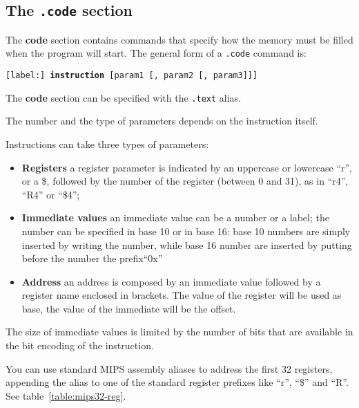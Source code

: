 \documentclass[12pt]{report}
\begin{document}
\subsection{The \texttt{.code} section}
The \textbf{code} section contains commands that specify how the memory must be
filled when the program will start. The general form of a \texttt{.code} command
is:

\begin{center}
	\texttt{[label:] \textbf{instruction} [param1 [, param2 [, param3]]]}
\end{center}

The \textbf{code} section can be specified with the \texttt{.text} alias.

The number and the type of parameters depends on the instruction itself.

Instructions can take three types of parameters:
\begin{itemize}
	\item \textbf{Registers} a register parameter is indicated by an uppercase
    or lowercase ``r'', or a \$, followed by the number of the register (between
	0 and 31), as in ``r4'', ``R4'' or ``\$4'';
	\item \textbf{Immediate values} an immediate value can be a number or a
	label; the number can be specified in base 10 or in base 16: base 10 numbers
	are simply inserted by writing the number, while base 16 number are inserted
	by putting before the number the prefix``0x''
	\item \textbf{Address} an address is composed by an immediate value followed
	by a register name enclosed in brackets. The value of the register will be 
	used as base, the value of the immediate will be the offset.
\end{itemize}

The size of immediate values is limited by the number of bits that are available
in the bit encoding of the instruction. 

You can use standard MIPS assembly aliases to address the first 32 registers,
appending the alias to one of the standard register prefixes like ``r'', ``\$''
and ``R''. See table~\ref{table:mips32-reg}.
\end{document}
